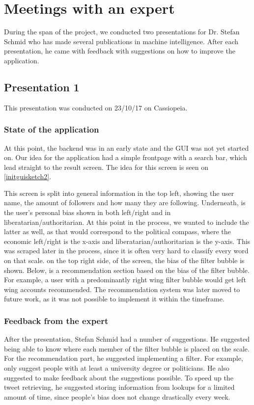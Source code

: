 \section{Meetings with an expert} \label{expMeeting}
During the span of the project, we conducted two presentations for Dr. Stefan
Schmid who has made several publications in machine intelligence. After
each presentation, he came with feedback with suggestions on how to improve the
application. 
\subsection{Presentation 1}
This presentation was conducted on 23/10/17 on Cassiopeia. 
\subsubsection{State of the application}
At this point, the backend was in an early state and the \ac{GUI} was not yet
started on. Our idea for the application had a simple frontpage with a search
bar, which lead straight to the result screen. The idea for this screen is seen
on \autoref{initguisketch2}.


This screen is split into general information in the top left, showing the user
name, the amount of followers and how many they are following. Underneath, is
the user's personal bias shown in both left/right and in
liberatarian/authoritarian. At this point in the process, we wanted to include
the latter as well, as that would correspond to the political compass, where the
economic left/right is the x-axis and liberatarian/authoritarian is the y-axis.
This was scraped later in the process, since it is often very hard to classify
every word on that scale. on the top right side, of the screen, the bias of the
filter bubble is shown. Below, is a recommendation section based on the bias of
the filter bubble. For example, a user with a predominantly right wing
filter bubble would get left wing accounts recommended. The recommendation
system was later moved to future work, as it was not possible to implement it within
the timeframe. 

\subsubsection{Feedback from the expert}
After the presentation, Stefan Schmid had a number of suggestions. He suggested
being able to know where each member of the filter bubble is placed on the
scale.
For the recommendation part, he suggested implementing a filter. For example,
only suggest people with at least a university degree or politicians. 
He also suggested to make feedback about the suggestions possible.
To speed up the tweet retrieving, he suggested storing information from lookups
for a limited amount of time, since people's bias does not change drastically
every week. 

